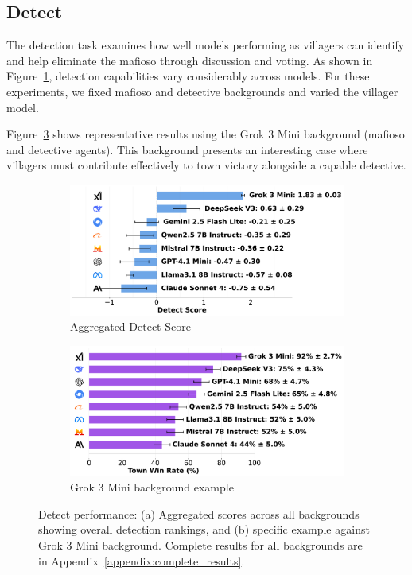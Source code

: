 \documentclass{article}
\begin{document}
\subsection{Detect}

The detection task examines how well models performing as villagers can identify and help eliminate the mafioso through discussion and voting. As shown in Figure~\ref{fig:detect_score}, detection capabilities vary considerably across models. For these experiments, we fixed mafioso and detective backgrounds and varied the villager model.

Figure~\ref{fig:detect_example} shows representative results using the Grok 3 Mini background (mafioso and detective agents). This background presents an interesting case where villagers must contribute effectively to town victory alongside a capable detective.

\begin{figure}[htbp]
    \centering
    \begin{subfigure}[b]{0.48\textwidth}
        \centering
        \includegraphics[width=\textwidth]{../results/villager_score_benchmark.png}
        \caption{Aggregated Detect Score}
        \label{fig:detect_score}
    \end{subfigure}
    \hfill
    \begin{subfigure}[b]{0.48\textwidth}
        \centering
        \includegraphics[width=\textwidth]{../results/villager_grok_3_mini_v4_1_benchmark.png}
        \caption{Grok 3 Mini background example}
        \label{fig:detect_grok_example}
    \end{subfigure}
    \caption{Detect performance: (a) Aggregated scores across all backgrounds showing overall detection rankings, and (b) specific example against Grok 3 Mini background. Complete results for all backgrounds are in Appendix~\ref{appendix:complete_results}.}
    \label{fig:detect_example}
\end{figure}
\end{document}
